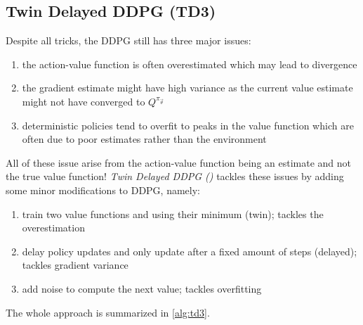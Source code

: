 		\subsection{Twin Delayed \acs{DDPG} (\acs{TD3})}
			Despite all tricks, the \ac{DDPG} still has three major issues:
			\begin{enumerate}
				\item the action-value function is often overestimated which may lead to divergence
				\item the gradient estimate might have high variance as the current value estimate might not have converged to \(Q^{\pi_{\vec{\theta}}}\)
				\item deterministic policies tend to overfit to peaks in the value function which are often due to poor estimates rather than the environment
			\end{enumerate}
			All of these issue arise from the action-value function being an estimate and not the true value function! \emph{Twin Delayed \ac{DDPG} ()} tackles these issues by adding some minor modifications to \ac{DDPG}, namely:
			\begin{enumerate}
				\item train two value functions and using their minimum (twin); tackles the overestimation
				\item delay policy updates and only update after a fixed amount of steps (delayed); tackles gradient variance
				\item add noise to compute the next value; tackles overfitting
			\end{enumerate}
			The whole approach is summarized in \autoref{alg:td3}.

